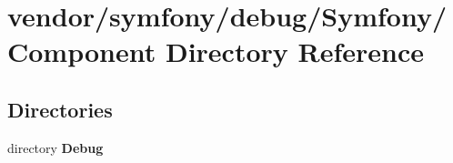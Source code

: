 \section{vendor/symfony/debug/\+Symfony/\+Component Directory Reference}
\label{dir_89847362decd5d1707d204d3fddc0b2f}
\subsection*{Directories}
\begin{DoxyCompactItemize}
\item 
directory {\bf Debug}
\end{DoxyCompactItemize}
